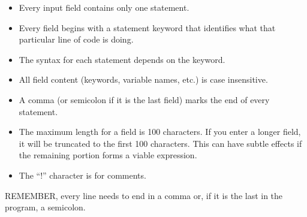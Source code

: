 \begin{itemize}
\item
  Every input field contains only one statement.
\item
  Every field begins with a statement keyword that identifies what that particular line of code is doing.
\item
  The syntax for each statement depends on the keyword.
\item
  All field content (keywords, variable names, etc.) is case insensitive.
\item
  A comma (or semicolon if it is the last field) marks the end of every statement.
\item
  The maximum length for a field is 100 characters. If you enter a longer field, it will be truncated to the first 100 characters. This can have subtle effects if the remaining portion forms a viable expression.
\item
  The ``!'' character is for comments.
\end{itemize}

REMEMBER, every line needs to end in a comma or, if it is the last in the program, a semicolon.
